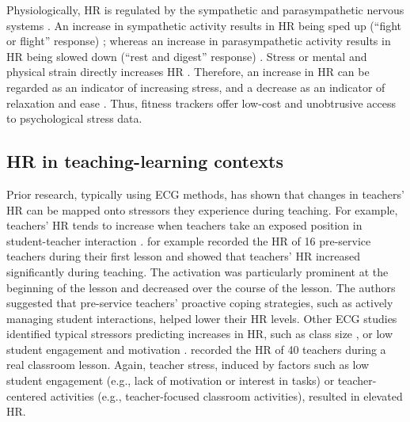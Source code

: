 \documentclass[preprint, 3p,
sort,]{elsarticle} %
\begin{document}
Physiologically, HR is regulated by the sympathetic and parasympathetic
nervous systems \citep{pham2021}. An increase in sympathetic activity
results in HR being sped up (``fight or flight'' response)
\citep{taelman2009influence}; whereas an increase in parasympathetic
activity results in HR being slowed down (``rest and digest'' response)
\citep{battipaglia2015}. Stress or mental and physical strain directly
increases HR \citep{custodis2014heart, sachs2014}. Therefore, an
increase in HR can be regarded as an indicator of increasing stress, and
a decrease as an indicator of relaxation and ease \citep{kyriacou1978}.
Thus, fitness trackers offer low-cost and unobtrusive access to
psychological stress data.

\subsection{HR in teaching-learning
contexts}\label{hr-in-teaching-learning-contexts}

Prior research, typically using ECG methods, has shown that changes in
teachers' HR can be mapped onto stressors they experience during
teaching. For example, teachers' HR tends to increase when teachers take
an exposed position in student-teacher interaction
\citep{sperka1995, scheuch1997psychophysische, donker2018, junker2021}.
\citet{sperka1995} for example recorded the HR of 16 pre-service
teachers during their first lesson and showed that teachers' HR
increased significantly during teaching. The activation was particularly
prominent at the beginning of the lesson and decreased over the course
of the lesson. The authors suggested that pre-service teachers'
proactive coping strategies, such as actively managing student
interactions, helped lower their HR levels. Other ECG studies identified
typical stressors predicting increases in HR, such as class size
\citep{huang2022class}, or low student engagement and motivation
\citep{junker2021}. \citet{junker2021} recorded the HR of 40 teachers
during a real classroom lesson. Again, teacher stress, induced by
factors such as low student engagement (e.g., lack of motivation or
interest in tasks) or teacher-centered activities (e.g., teacher-focused
classroom activities), resulted in elevated HR.
\end{document}

